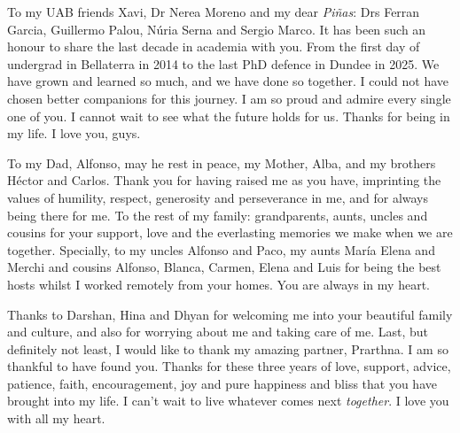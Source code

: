 To my UAB friends Xavi, Dr Nerea Moreno and my dear \textit{Piñas}: Drs Ferran Garcia, Guillermo Palou, Núria Serna and Sergio Marco. It has been such an honour to share the last decade in academia with you. From the first day of undergrad in Bellaterra in 2014 to the last PhD defence in Dundee in 2025. We have grown and learned so much, and we have done so together. I could not have chosen better companions for this journey. I am so proud and admire every single one of you. I cannot wait to see what the future holds for us. Thanks for being in my life. I love you, guys.

To my Dad, Alfonso, may he rest in peace, my Mother, Alba, and my brothers Héctor and Carlos. Thank you for having raised me as you have, imprinting the values of humility, respect, generosity and perseverance in me, and for always being there for me. To the rest of my family: grandparents, aunts, uncles and cousins for your support, love and the everlasting memories we make when we are together. Specially, to my uncles Alfonso and Paco, my aunts María Elena and Merchi and cousins Alfonso, Blanca, Carmen, Elena and Luis for being the best hosts whilst I worked remotely from your homes. You are always in my heart.

Thanks to Darshan, Hina and Dhyan for welcoming me into your beautiful family and culture, and also for worrying about me and taking care of me. Last, but definitely not least, I would like to thank my amazing partner, Prarthna. I am so thankful to have found you. Thanks for these three years of love, support, advice, patience, faith, encouragement, joy and pure happiness and bliss that you have brought into my life. I can't wait to live whatever comes next \textit{together}. I love you with all my heart.